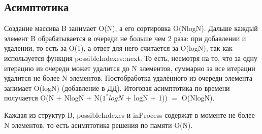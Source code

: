 \subsection{Асимптотика}
Создание массива B занимает O(N), а его сортировка O(NlogN). Дальше каждый элемент B обрабатывается в очереди не больше чем 2 раза: при добавлении и удалении, то есть за O(1), а ответ для него считается за O(logN), так как используется функция possibleIndexes::next. То есть, несмотря на то, что за одну итерацию из очереди может удалится до N элементов, суммарно за все итерации удалится не более N элементов. Постобработка удалённого из очереди элемента занимает O(logN) (добавление в ДД). Итоговая асимптотика по времени получается O(N + NlogN + N($1^*logN$ + logN + 1)) $=$ O(NlogN).

Каждая из структур B, possibleIndexes и inProcess содержат в моменте не более N элементов, то есть асимптотика решения по памяти O(N).

